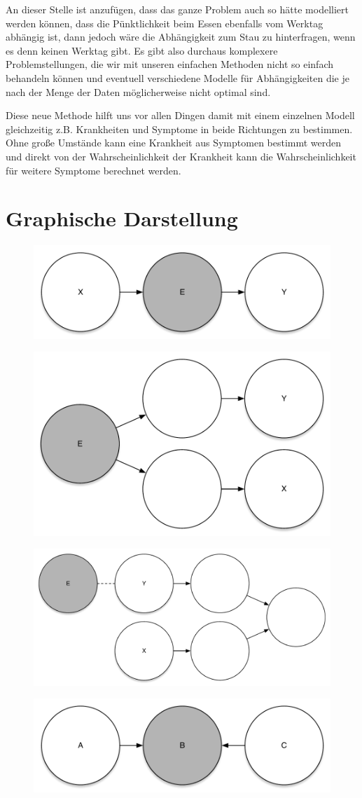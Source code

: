An dieser Stelle ist anzufügen, dass das ganze Problem auch so hätte modelliert werden können, dass die Pünktlichkeit beim Essen ebenfalls vom Werktag abhängig ist, dann jedoch wäre die Abhängigkeit zum Stau zu hinterfragen, wenn es denn keinen Werktag gibt.
Es gibt also durchaus komplexere Problemstellungen, die wir mit unseren einfachen Methoden nicht so einfach behandeln können und eventuell verschiedene Modelle für Abhängigkeiten die je nach der Menge der Daten möglicherweise nicht optimal sind.

Diese neue Methode hilft uns vor allen Dingen damit mit einem einzelnen Modell gleichzeitig z.B. Krankheiten und Symptome in beide Richtungen zu bestimmen. Ohne große Umstände kann eine Krankheit aus Symptomen bestimmt werden und direkt von der Wahrscheinlichkeit der Krankheit kann die Wahrscheinlichkeit für weitere Symptome berechnet werden.

\section{Graphische Darstellung}
\begin{figure}[h]
    \centering
    \includegraphics[width=.2\textwidth]{chapters/bayes/bayes_net_1.pdf}
\end{figure}
\begin{figure}[h]
    \centering
    \includegraphics[width=.2\textwidth]{chapters/bayes/bayes_net_2.pdf}
\end{figure}
\begin{figure}[h]
    \centering
    \includegraphics[width=.2\textwidth]{chapters/bayes/bayes_net_3.pdf}
\end{figure}
\begin{figure}[h]
    \centering
    \includegraphics[width=.2\textwidth]{chapters/bayes/bayes_net_4.pdf}
\end{figure}

